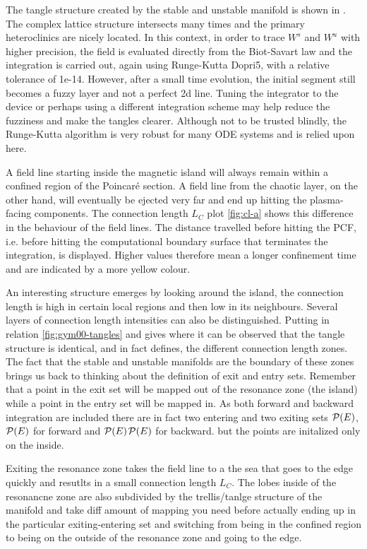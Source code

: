 The tangle structure created by the stable and unstable manifold is shown in . The complex lattice structure intersects many times and the primary heteroclinics are nicely located. In this context, in order to trace $W^s$ and $W^u$ with higher precision, the field is evaluated directly from the Biot-Savart law and the integration is carried out, again using Runge-Kutta Dopri5, with a relative tolerance of 1e-14. However, after a small time evolution, the initial segment still becomes a fuzzy layer and not a perfect 2d line. Tuning the integrator to the device or perhaps using a different integration scheme may help reduce the fuzziness and make the tangles clearer. Although not to be trusted blindly, the Runge-Kutta algorithm is very robust for many ODE systems and is relied upon here.

A field line starting inside the magnetic island will always remain within a confined region of the Poincaré section. A field line from the chaotic layer, on the other hand, will eventually be ejected very far and end up hitting the plasma-facing components. The connection length $L_C$ plot \ref{fig:cl-a} shows this difference in the behaviour of the field lines. The distance travelled before hitting the PCF, i.e. before hitting the computational boundary surface that terminates the integration, is displayed. Higher values therefore mean a longer confinement time and are indicated by a more yellow colour.

An interesting structure emerges by looking around the island, the connection length is high in certain local regions and then low in its neighbours. Several layers of connection length intensities can also be distinguished. Putting in relation \ref{fig:gym00-tangles} and  gives  where it can be observed that the tangle structure is identical, and in fact defines, the different connection length zones. The fact that the stable and unstable manifolds are the boundary of these zones brings us back to thinking about the definition of exit and entry sets. Remember that a point in the exit set will be mapped out of the resonance zone (the island) while a point in the entry set will be mapped in. As both forward and backward integration are included there are in fact two entering and two exiting sets $\mathcal{P}(E)$, $\mathcal{P}(E)$ for forward and $\mathcal{P}(E)$$\mathcal{P}(E)$ for backward. but the points are initalized only on the inside.

Exiting the resonance zone takes the field line to a the sea that goes to the edge quickly and resutlts in a small connection length $L_C$. The lobes inside of the resonancne zone are also subdivided by the trellis/tanlge structure of the manifold and take diff amount of mapping you need before actually ending up in the particular exiting-entering set and switching from being in the confined region to being on the outside of the resonance zone and going to the edge.

